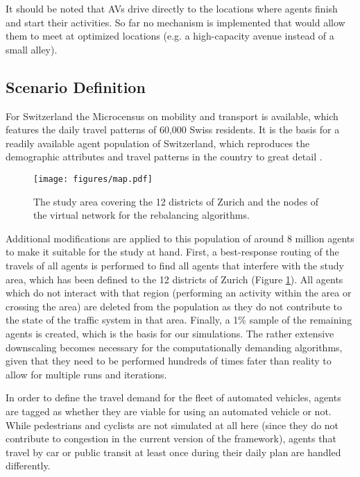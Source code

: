 It should be noted that AVs drive directly to the locations where agents finish and
start their activities. So far no mechanism is implemented that would allow them
to meet at optimized locations (e.g. a high-capacity avenue instead of a small
alley).

\subsection{Scenario Definition}

For Switzerland the Microcensus on mobility and transport \cite{microcensus} is
available, which features the daily travel patterns of 60,000 Swiss residents.
It is the basis for a readily available agent population of
Switzerland, which reproduces the demographic attributes and travel patterns
in the country to great detail \cite{ivtbaseline}.

\begin{figure}[h]
\begin{center}\texttt{[image: figures/map.pdf]}\end{center}
\caption{The study area covering the 12 districts of Zurich and the nodes of the virtual network for the rebalancing algorithms.}
\label{fig:study_area_vnodes}
\end{figure}

Additional modifications are applied to this population of around 8 million
agents to make it suitable for the study at hand. First, a best-response routing
of the travels of all agents is performed to find all agents that interfere
with the study area, which has been defined to the 12 districts of Zurich (Figure \ref{fig:study_area_vnodes}).
All agents which do not interact with that region (performing an activity within
the area or crossing the area) are deleted from the population as they do
not contribute to the state of the traffic system in that area. Finally, a 1\%
sample of the remaining agents is created, which is the basis for our
simulations. The rather extensive downscaling becomes necessary for the computationally
demanding algorithms, given that they need to be performed hundreds of times fater
than reality to allow for multiple runs and iterations.

In order to define the travel demand for the fleet of automated vehicles, agents
are tagged as whether they are viable for using an automated vehicle or not.
While pedestrians and cyclists are not simulated at all here (since they do not
contribute to congestion in the current version of the framework), agents that
travel by car or public transit at least once during their daily plan are
handled differently.

